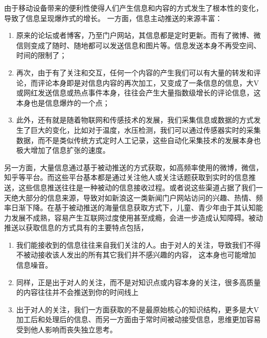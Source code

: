由于移动设备带来的便利性使得人们产生信息和内容的方式发生了根本性的变化，导致了信息呈现爆炸式的增长。%
一方面，信息主动推送的来源丰富：
\begin{enumerate}
\item 原来的论坛或者博客，乃至门户网站，其信息都是定时更新。而有了微博、微信则变成了随时、随地都可以发送信息和图片等。信息发送本身不再受空间、时间的限制了；

\item 再次，由于有了关注和交互，任何一个内容的产生我们可以有大量的转发和评论，而评论本身即是对信息内容的再次加工，又变成了一条信息的信息，大V或网红发送信息或热点事件本身，往往会产生大量指数级增长的评论信息，这本身也是信息爆炸的一个点；

\item 此外，还有就是随着物联网和传感技术的发展，我们采集信息或数据的方式发生了巨大的变化，比如对于温度，水压检测，我们可以通过传感器实时的采集数据，而不是类似传统方式定时人工记录，这些自动化采集技术的发展本身也极大增加了信息扩张的速度。
\end{enumerate}

另一方面，大量信息通过基于被动推送的方式获取，如高频率使用的微博，微信，知乎等平台。而这些平台基本都是通过关注他人或关注话题获取到实时的信息推送，这些信息推送往往是一种被动的信息接收过程。或者说这些渠道占据了我们一天绝大部分的信息来源，导致对如新浪这一类新闻门户网站访问的兴趣、热情、频率日渐下降。在基于被动推送的海量信息获取方式下，儿童、青少年由于其认知能力发展不成熟，容易产生互联网过度使用甚至成瘾，会进一步造成认知障碍。被动推送以获取信息的方式具有的主要特点包括，
\begin{enumerate}
\item 我们能接收到的信息往往来自我们关注的人。由于对人的关注，导致我们不得不被动接收该人发出的所有其它我们并不感兴趣的内容，%
这本身也可能增加信息噪音。

\item  同样，正是出于对人的关注，而不是对知识点或内容本身的关注，很多高质量的内容往往并不会推送到你的时间线上%
 
\item 出于对人的关注，我们一方面获取的不是最原始核心的知识结构，更多是大V加工后和处理后的信息、而另一方面由于常时间被动接受信息，思维更加容易受到他人影响而丧失独立思考。
\end{enumerate}

